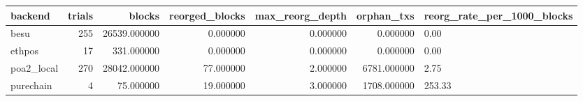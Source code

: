\begin{tabular}{lrrrrrl}
\toprule
backend & trials & blocks & reorged\_blocks & max\_reorg\_depth & orphan\_txs & reorg\_rate\_per\_1000\_blocks \\
\midrule
besu & 255 & 26539.000000 & 0.000000 & 0.000000 & 0.000000 & 0.00 \\
ethpos & 17 & 331.000000 & 0.000000 & 0.000000 & 0.000000 & 0.00 \\
poa2\_local & 270 & 28042.000000 & 77.000000 & 2.000000 & 6781.000000 & 2.75 \\
purechain & 4 & 75.000000 & 19.000000 & 3.000000 & 1708.000000 & 253.33 \\
\bottomrule
\end{tabular}

